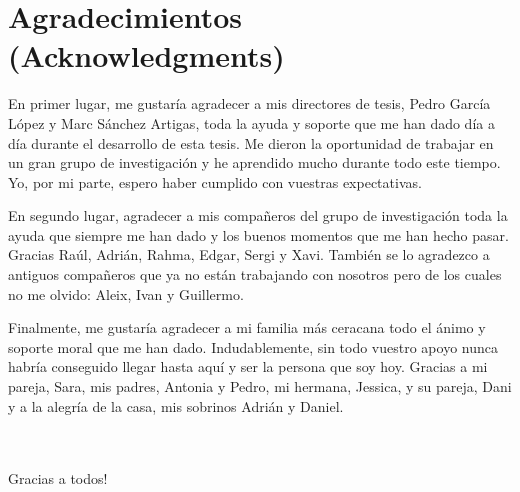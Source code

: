 \section*{Agradecimientos (Acknowledgments)}

En primer lugar, me gustar\'ia agradecer a mis directores de tesis, Pedro Garc\'ia L\'opez y  Marc S\'anchez Artigas,
toda la ayuda y soporte que me han dado d\'ia a d\'ia durante el desarrollo de esta tesis. Me dieron la oportunidad
de trabajar en un gran grupo de investigaci\'on y he aprendido mucho durante todo este tiempo. Yo, por mi parte, espero
haber cumplido con vuestras expectativas.

En segundo lugar, agradecer a mis compa\~neros del grupo de investigaci\'on toda la ayuda que siempre me han dado y los buenos momentos que me han hecho pasar. Gracias Ra\'ul, Adri\'an, Rahma, Edgar, Sergi y Xavi. Tambi\'en se lo agradezco a antiguos compa\~neros que ya no est\'an trabajando con nosotros pero de los cuales no me olvido: Aleix, Ivan y Guillermo.

Finalmente, me gustar\'ia agradecer a mi familia m\'as ceracana todo el \'animo y soporte moral que me han dado. Indudablemente, sin todo vuestro apoyo nunca habr\'ia conseguido llegar hasta aqu\'i y ser la persona que soy hoy. Gracias a mi pareja, Sara, mis padres, Antonia y Pedro, mi hermana, Jessica, y su pareja, Dani y a la alegr\'ia de la casa, mis sobrinos Adri\'an y Daniel.

\\
\\
Gracias a todos!